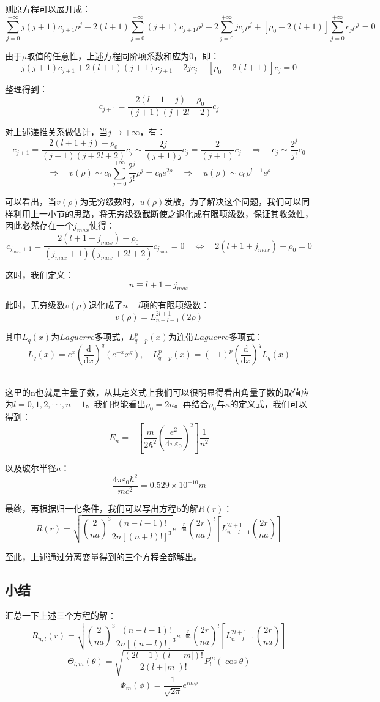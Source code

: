 则原方程可以展开成：
\[\sum_{j=0}^{+\infty}j(j+1)c_{j+1}\rho^j+2(l+1)\sum_{j=0}^{+\infty}(j+1)c_{j+1}\rho^j-2\sum_{j=0}^{+\infty}jc_j\rho^j+[\rho_0-2(l+1)]\sum_{j=0}^{+\infty}c_j\rho^j=0\]

由于$\rho$取值的任意性，上述方程同阶项系数和应为0，即：
\[j(j+1)c_{j+1}+2(l+1)(j+1)c_{j+1}-2jc_j+[\rho_0-2(l+1)]c_j=0\]

整理得到：
\[c_{j+1}=\frac{2(l+1+j)-\rho_0}{(j+1)(j+2l+2)}c_j\]

对上述递推关系做估计，当$j \rightarrow +\infty$，有：
\[c_{j+1}=\frac{2(l+1+j)-\rho_0}{(j+1)(j+2l+2)}c_j \sim \frac{2j}{(j+1)j}c_j=\frac{2}{(j+1)}c_j \quad \Rightarrow \quad c_j \sim \frac{2^j}{j!}c_0\]
\[\Rightarrow \quad v(\rho) \sim c_0\sum_{j=0}^{+\infty}\frac{2^j}{j!}\rho^j=c_0e^{2\rho} \quad \Rightarrow \quad u(\rho) \sim c_0\rho^{l+1}e^{\rho}\]

可以看出，当$v(\rho)$为无穷级数时，$u(\rho)$发散，为了解决这个问题，我们可以同样利用上一小节的思路，将无穷级数截断使之退化成有限项级数，保证其收敛性，因此必然存在一个$j_{max}$使得：
\[c_{j_{max}+1}=\frac{2(l+1+j_{max})-\rho_0}{(j_{max}+1)(j_{max}+2l+2)}c_{j_{max}}=0 \quad \Leftrightarrow \quad 2(l+1+j_{max})-\rho_0=0\]

这时，我们定义：
\[n \equiv l+1+j_{max}\]

此时，无穷级数$v(\rho)$退化成了$n-l$项的有限项级数：
\[v(\rho)=L_{n-l-1}^{2l+1}(2\rho)\]

其中$L_q(x)$为$Laguerre$多项式，$L_{q-p}^{p}(x)$为连带$Laguerre$多项式：
\[L_q(x)=e^x\left ( \frac{\mathrm{d}}{\mathrm{d}x} \right )^q(e^{-x}x^q), \quad L_{q-p}^{p}(x)=(-1)^p \left ( \frac{\mathrm{d}}{\mathrm{d}x} \right )^qL_q(x)\]\

这里的n也就是主量子数，从其定义式上我们可以很明显得看出角量子数的取值应为$l=0,1,2, \cdot\cdot\cdot ,n-1$。我们也能看出$\rho_0=2n$。再结合$\rho_0$与$\kappa$的定义式，我们可以得到：
\[E_n=- \left [\frac{m}{2\hbar^2} \left ( \frac{e^2}{4 \pi \varepsilon_0} \right )^2 \right ] \frac{1}{n^2}\]

以及玻尔半径$a$：
\[\frac{4 \pi \varepsilon_0 \hbar^2}{me^2}=0.529 \times 10^{-10}m\]

最终，再根据归一化条件，我们可以写出方程b的解$R(r)$：
\[R(r)=\sqrt{ \left (\frac{2}{na} \right )^3 \frac{(n-l-1)!}{2n[(n+l)!]^3}}e^{-\frac{r}{na}}\left (\frac{2r}{na} \right )^l \left [L_{n-l-1}^{2l+1} \left ( \frac{2r}{na} \right ) \right ]\]

至此，上述通过分离变量得到的三个方程全部解出。

\subsection{小结}
汇总一下上述三个方程的解：
\[R_{n,l}(r)=\sqrt{ \left (\frac{2}{na} \right )^3 \frac{(n-l-1)!}{2n[(n+l)!]^3}}e^{-\frac{r}{na}}\left (\frac{2r}{na} \right )^l \left [L_{n-l-1}^{2l+1} \left ( \frac{2r}{na} \right ) \right ]\]
\[\Theta_{l,m}(\theta)=\sqrt{\frac{(2l-1)(l-|m|)!}{2(l+|m|)!}}P^{m}_l(\cos\theta)\]
\[\varPhi_{m}(\phi)=\frac{1}{\sqrt{2\pi}}e^{im\phi}\]

